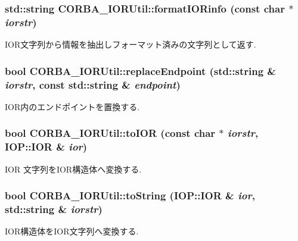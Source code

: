 \subsubsection[{formatIORinfo}]{\setlength{\rightskip}{0pt plus 5cm}std::string CORBA\_\-IORUtil::formatIORinfo (const char $\ast$ {\em iorstr})}\label{namespaceCORBA__IORUtil_a9e4dfff4103d028b8958ab7ef15c83d5}


IOR文字列から情報を抽出しフォーマット済みの文字列として返す. 

\subsubsection[{replaceEndpoint}]{\setlength{\rightskip}{0pt plus 5cm}bool CORBA\_\-IORUtil::replaceEndpoint (std::string \& {\em iorstr}, \/  const std::string \& {\em endpoint})}\label{namespaceCORBA__IORUtil_a0e12e01df775b2acfb22e1442ac69785}


IOR内のエンドポイントを置換する. 

\subsubsection[{toIOR}]{\setlength{\rightskip}{0pt plus 5cm}bool CORBA\_\-IORUtil::toIOR (const char $\ast$ {\em iorstr}, \/  IOP::IOR \& {\em ior})}\label{namespaceCORBA__IORUtil_a72b91b72b943dbe26800d2e75c48c736}


IOR 文字列をIOR構造体へ変換する. 

\subsubsection[{toString}]{\setlength{\rightskip}{0pt plus 5cm}bool CORBA\_\-IORUtil::toString (IOP::IOR \& {\em ior}, \/  std::string \& {\em iorstr})}\label{namespaceCORBA__IORUtil_a6b8cf0c6ed5a0140e249773ee2f6ceb0}


IOR構造体をIOR文字列へ変換する. 

